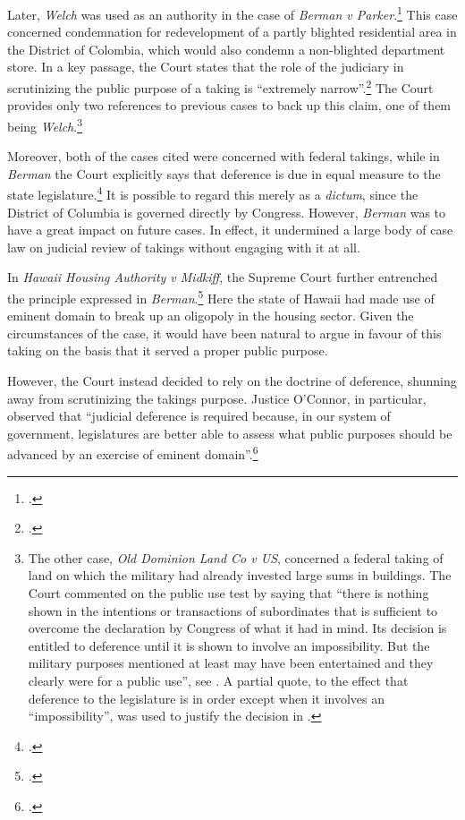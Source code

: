 Later, {\it Welch} was used as an authority in the case of {\it Berman v Parker}.\footcite{berman54} This case concerned condemnation for redevelopment of a partly blighted residential area in the District of Colombia, which would also condemn a non-blighted department store. In a key passage, the Court states that the role of the judiciary in scrutinizing the public purpose of a taking is ``extremely narrow''.\footcite[32]{berman54} The Court provides only two references to previous cases to back up this claim, one of them being {\it Welch}.\footnote{The other case, {\it Old Dominion Land Co v US}, concerned a federal taking of land on which the military had already invested large sums in buildings. The Court commented on the public use test by saying that ``there is nothing shown in the intentions or transactions of subordinates that is sufficient to overcome the declaration by Congress of what it had in mind. Its decision is entitled to deference until it is shown to involve an impossibility. But the military purposes mentioned at least may have been entertained and they clearly were for a public use'', see \cite[66]{dominion25}. A partial quote, to the effect that deference to the legislature is in order except when it involves an ``impossibility'', was used to justify the decision in \cite[240]{midkiff84}.}

Moreover, both of the cases cited were concerned with federal takings, while in {\it Berman} the Court explicitly says that deference is due in equal measure to the state legislature.\footcite[32]{berman54} It is possible to regard this merely as a {\it dictum}, since the District of Columbia is governed directly by Congress. However, {\it Berman} was to have a great impact on future cases. In effect, it undermined a large body of case law on judicial review of takings without engaging with it at all.

In {\it Hawaii Housing Authority v Midkiff}, the Supreme Court further entrenched the principle expressed in {\it Berman}.\footcite{midkiff84} Here the state of Hawaii had made use of eminent domain  to break up an oligopoly in the housing sector. Given the circumstances of the case, it would have been natural to argue in favour of this taking on the basis that it served a proper public purpose.

However, the Court instead decided to rely on the doctrine of deference, shunning away from scrutinizing the takings purpose. Justice O'Connor, in particular, observed that ``judicial deference is required because, in our system of government, legislatures are better able to assess what public purposes should be advanced by an exercise of eminent domain''.\footcite[244]{midkiff84}

